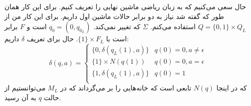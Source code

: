 حال سعی می‌کنیم که به زبان ریاضی ماشین نهایی را تعریف کنیم. برای این کار همان طور که گفته شد نیاز
به دو برابر حالات ماشین اول داریم. برای این کار من از
$Q = \{0,1\} \times Q_L$
استفاده می‌کنم.
$\Sigma$
که تغییر نمی‌کند.
$q_0 = (0, q_{0_L})$
است و
$F$
برابر است با
$\{1\} \times F_L$.
حال برای تعریف
$\delta$
داریم:
\begin{equation*}
    \delta(q, a) =
      \begin{cases}
        \{0, \delta(q_L(1), a)\} & q(0) = 0, a \ne \epsilon\\
        \{1\} \times N(q(1)) & q(0) = 0, a = \epsilon\\
        \{1, \delta(q_L(1), a)\} & q(0) = 1\\
      \end{cases}
\end{equation*}
که در اینجا
$N(q)$
تابعی است که خانه‌هایی را بر می‌گرداند که در
$M_L$
می‌توانستیم از حالت
$q$
به آن رسید.